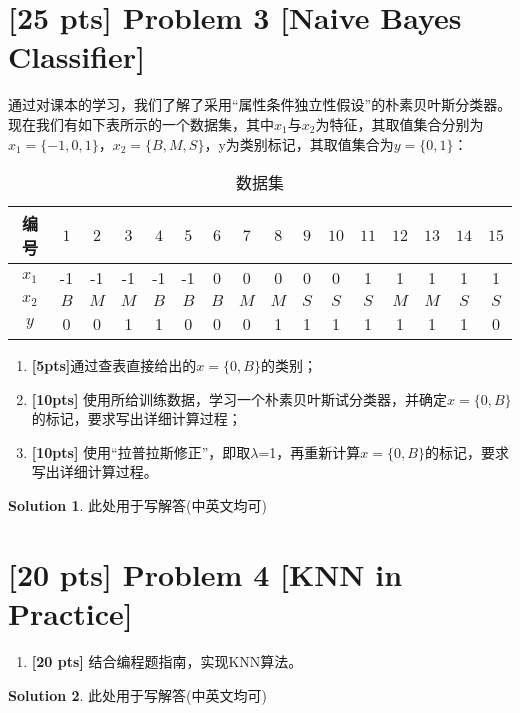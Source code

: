 \documentclass[a4paper,UTF8]{article}
\theoremstyle{definition}
\newtheorem*{solution}{Solution}
\begin{document}
\section*{[25 pts] Problem 3 [Naive Bayes Classifier]}
通过对课本的学习，我们了解了采用“属性条件独立性假设”的朴素贝叶斯分类器。现在我们有如下表所示的一个数据集，其中$x_1$与$x_2$为特征，其取值集合分别为$x_1=\{-1,0,1\}$，$x_2=\{B,M,S\}$，y为类别标记，其取值集合为$y=\{0,1\}$：
	\begin{table}[htp]
		\centering
		\caption{数据集}\label{tab:aStrangeTable}
	\begin{tabular}{cccccccccccccccc}
		\hline 
	编号	& $1$ & $2$ & $3$ & $4$ & $5$ & $6$ & $7$ & $8$ & $9$ & $10$ & $11$ & $12$ & $13$ & $14$ & $15$\\ 
		\hline 
	$x_1$	& -1 & -1 & -1 & -1 & -1 & 0 & 0 & 0 & 0 & 0 & 1 & 1 & 1 & 1 & 1 \\ 
		\hline 
	$x_2$	& $B$ &$M$ &$M$ &$B$ &$B$ &$B$ &$M$ &$M$ &$S$ &$S$ &$S$ &$M$ &$M$ &$S$ &$S$  \\ 
		\hline 
	$y$	& 0 & 0 & 1 & 1 & 0 & 0 & 0 & 1 & 1 & 1 & 1 & 1 & 1 & 1 & 0 \\ 
		\hline 
	\end{tabular}
	\end{table} 
	
	\begin{enumerate}[(1)]
	    \item \textbf{[5pts]}通过查表直接给出的$x=\{0,B\}$的类别；
		\item \textbf{[10pts]} 使用所给训练数据，学习一个朴素贝叶斯试分类器，并确定$x=\{0,B\}$的标记，要求写出详细计算过程；
		\item \textbf{[10pts]} 使用“拉普拉斯修正”，即取$\lambda$=1，再重新计算$x=\{0,B\}$的标记，要求写出详细计算过程。
	\end{enumerate}
	
\begin{solution}
此处用于写解答(中英文均可)
\end{solution}

	




\section*{[20 pts] Problem 4 [KNN in Practice]}

\par 
\begin{enumerate}[(1)]
	\item \textbf{[20 pts]} 结合编程题指南，实现KNN算法。

\end{enumerate}

\begin{solution}
此处用于写解答(中英文均可)
\end{solution}
\end{document}
